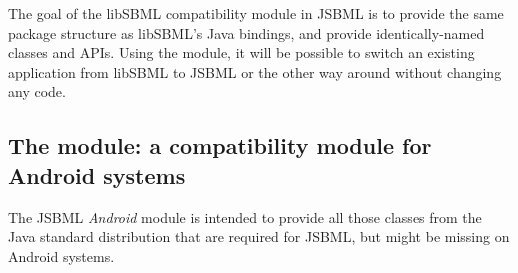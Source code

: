 The goal of the libSBML compatibility module in JSBML is to provide the
same package structure as libSBML's Java bindings, and provide
identically-named classes and APIs. Using the module, it will be possible
to switch an existing application from libSBML to JSBML or the other way
around without changing any code.  %


\subsection{The  module: a compatibility module for
  Android systems}

The JSBML \emph{Android} module is intended to provide all those classes
from the Java standard distribution that are required for JSBML, but might
be missing on Android systems.

